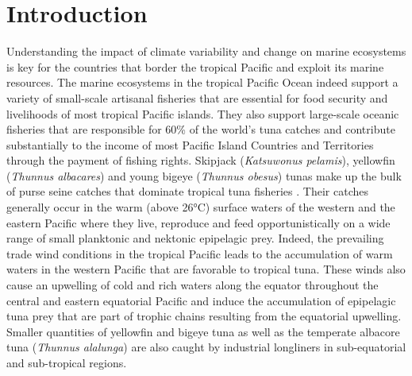 
\section{Introduction}

Understanding the impact of climate variability and change on marine ecosystems is key for the countries that border the tropical Pacific and exploit its marine resources. The marine ecosystems in the tropical Pacific Ocean indeed support a variety of small-scale artisanal fisheries that are essential for food security and livelihoods of most tropical Pacific islands. They also support large-scale oceanic fisheries that are responsible for 60\% of the world's tuna catches and  contribute substantially to the income of most Pacific Island Countries and Territories through the payment of fishing rights. Skipjack (\textit{Katsuwonus pelamis}), yellowfin (\textit{Thunnus albacares}) and young bigeye (\textit{Thunnus obesus}) tunas make up the bulk of purse seine catches that dominate tropical tuna fisheries \citep{allainOverviewTunaFisheries2018}. Their catches generally occur in the warm (above 26°C) surface waters of the western and the eastern Pacific where they live, reproduce and feed opportunistically on a wide range of small planktonic and nektonic epipelagic prey. Indeed, the prevailing trade wind conditions in the tropical Pacific leads to the accumulation of warm waters in the western Pacific that are favorable to tropical tuna. These winds also cause an upwelling of cold and rich waters along the equator throughout the central and eastern equatorial Pacific and induce the accumulation of epipelagic tuna prey that are part of trophic chains resulting from the equatorial upwelling. Smaller quantities of yellowfin and bigeye tuna as well as the temperate albacore tuna (\textit{Thunnus alalunga}) are also caught by industrial longliners in sub-equatorial and sub-tropical regions.

